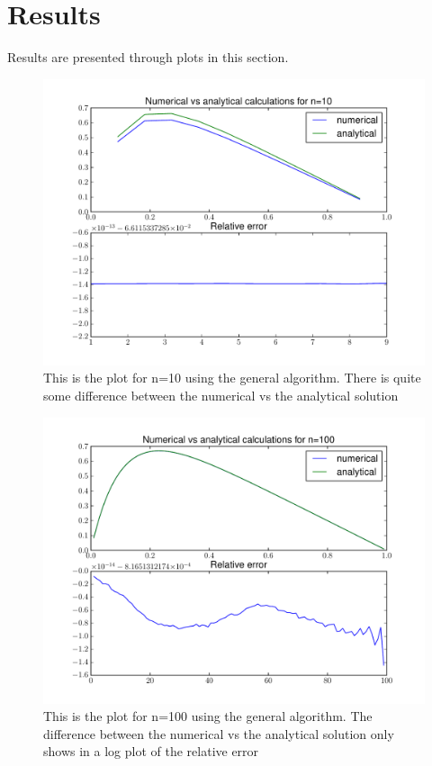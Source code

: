 \documentclass[10pt,a4paper]{article}
\begin{document}
    \section{Results}
    Results are presented through plots in this section.
    \begin{figure}
      \includegraphics[width = \textwidth]{general_10}
      \caption{This is the plot for n=10 using the general algorithm. There is quite some difference between the numerical vs the analytical solution}
    \end{figure}
    \begin{figure}
      \includegraphics[width = \textwidth]{general_100}
      \caption{This is the plot for n=100 using the general algorithm. The difference between the numerical vs the analytical solution only shows in a log plot of the relative error}
    \end{figure}
\end{document}
